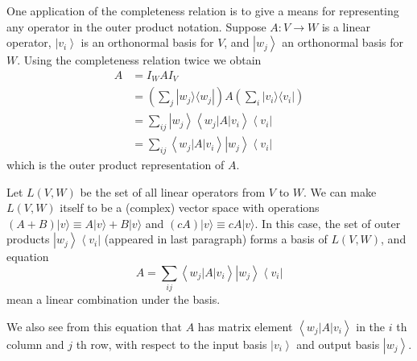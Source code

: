 One application of the completeness relation is to give a means for representing any operator in the outer product notation.
Suppose $A: V \rightarrow W$ is a linear operator, $\left|v_{i}\right\rangle$ is an orthonormal basis for $V$, and $\left|w_{j}\right\rangle$ an orthonormal basis for $W$. Using the completeness relation twice we obtain
\begin{equation}
\begin{aligned}
A & =I_{W} A I_{V} \\
& = \left(\sum_{j}|w_{j}\rangle\langle w_{j}|\right) A  \left(\sum_{i}|v_{i}\rangle\langle v_{i}|\right)\\
& =\sum_{i j}\left|w_{j}\right\rangle\left\langle w_{j}|A| v_{i}\right\rangle\left\langle v_{i}\right| \\
& =\sum_{i j}\left\langle w_{j}|A| v_{i}\right\rangle\left|w_{j}\right\rangle\left\langle v_{i}\right|
\end{aligned}
\end{equation}
which is the outer product representation of $A$. 

Let $L(V,W)$ be the set of all linear operators from $V$ to $W$.
We can make $L(V,W)$ itself to be a (complex) vector space with operations $(A +B) |v\rangle \equiv A |v\rangle + B |v\rangle$ and $(c A) |v\rangle \equiv c A |v\rangle$. 
In this case, the set of outer products $\left|w_{j}\right\rangle\left\langle v_{i}\right|$ (appeared in last paragraph) forms a basis of $L(V,W)$, and equation 
\begin{equation}
    A =\sum_{i j}\left\langle w_{j}|A| v_{i}\right\rangle\left|w_{j}\right\rangle\left\langle v_{i}\right|
\end{equation}
mean a linear combination under the basis.

We also see from this equation that $A$ has matrix element $\left\langle w_{j}|A| v_{i}\right\rangle$ in the $i$ th column and $j$ th row, with respect to the input basis $\left|v_{i}\right\rangle$ and output basis $\left|w_{j}\right\rangle$.



